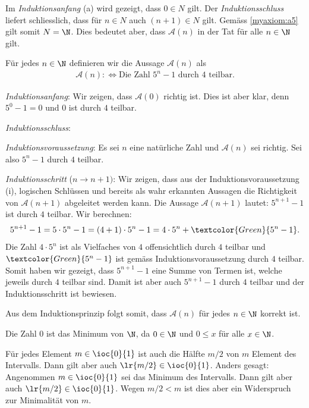 \begin{myanswer}[myexercise:0201]
	Im \textit{Induktionsanfang} (a) wird gezeigt, dass $0\in N$ gilt. Der \textit{Induktionsschluss} liefert schliesslich, dass für $n\in N$ auch $(n+1)\in N$ gilt. Gemäss \cref{myaxiom:a5} gilt somit $N=\N$. Dies bedeutet aber, dass $\mathcal{A}(n)$ in der Tat für alle $n\in\N$ gilt.
\end{myanswer}
\clearpage
\begin{myanswer}[myexercise:0202]
	Für jedes $n\in\N$ definieren wir die Aussage $\mathcal{A}(n)$ als
	\begin{align*}
		\mathcal{A}(n) :\iff \text{Die Zahl $5^n-1$ durch $4$ teilbar}.
	\end{align*}
	\begin{aenum}
		\item \textit{Induktionsanfang}: Wir zeigen, dass $\mathcal{A}(0)$ richtig ist. Dies ist aber klar, denn $5^0-1=0$ und $0$ ist durch $4$ teilbar.
		\item \textit{Induktionsschluss}:
		\begin{renum}
			\item \textit{Induktionsvoraussetzung}: Es sei $n$ eine natürliche Zahl und $\mathcal{A}(n)$ sei richtig. Sei also $5^n-1$ durch $4$ teilbar.
			\item \textit{Induktionsschritt} ($n\to n+1)$: Wir zeigen, dass aus der Induktionsvoraussetzung (i), logischen Schlüssen und bereits als wahr erkannten Aussagen die Richtigkeit von $\mathcal{A}(n+1)$ abgeleitet werden kann. Die Aussage $\mathcal{A}(n+1)$ lautet: $5^{n+1}-1$ ist durch $4$ teilbar. Wir berechnen:
				\begin{align*}
					5^{n+1}-1 = 5\cdot 5^{n}-1 = (4+1)\cdot 5^n - 1 = 4\cdot 5^n + \textcolor{Green}{5^n -1}.
				\end{align*}
				Die Zahl $4\cdot 5^n$ ist als Vielfaches von $4$ offensichtlich durch $4$ teilbar und $\textcolor{Green}{5^n -1}$ ist gemäss Induktionsvoraussetzung durch $4$ teilbar. Somit haben wir gezeigt, dass $5^{n+1}-1$ eine Summe von Termen ist, welche jeweils durch $4$ teilbar sind. Damit ist aber auch $5^{n+1}-1$ durch $4$ teilbar und der Induktionsschritt ist bewiesen.
		\end{renum}
	\end{aenum}
	Aus dem Induktionsprinzip folgt somit, dass $\mathcal{A}(n)$ für jedes $n\in\N$ korrekt ist.
\end{myanswer}

\begin{myanswer}[myexercise:0267]
	\begin{aenum}
		\item Die Zahl $0$ ist das Minimum von $\N$, da $0\in\N$ und $0\leq x$ für alle $x\in\N$.
		\item Für jedes Element $m\in\ioc{0}{1}$ ist auch die Hälfte $m/2$ von $m$ Element des Intervalls. Dann gilt aber auch $\lr{m/2}\in\ioc{0}{1}$. Anders gesagt: Angenommen $m\in\ioc{0}{1}$ sei das Minimum des Intervalls. Dann gilt aber auch $\lr{m/2}\in\ioc{0}{1}$. Wegen $m/2<m$ ist dies aber ein Widerspruch zur Minimalität von $m$.
	\end{aenum}
\end{myanswer}

